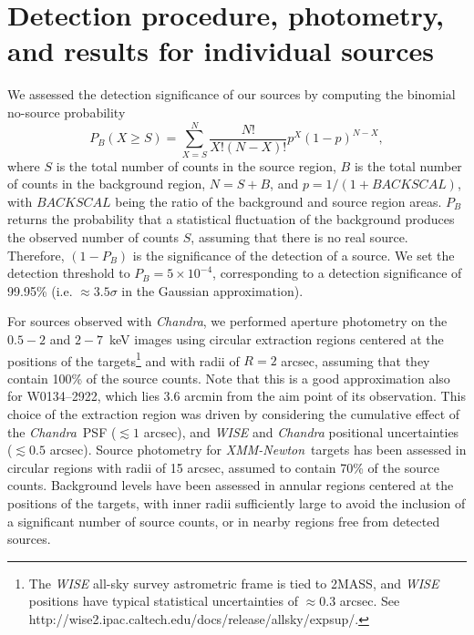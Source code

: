 \documentclass[useAMS,usenatbib]{mnras}
\newcommand*{\xmm}{\textit{\mbox{XMM-Newton}}}
\newcommand*{\chandra}{\textit{Chandra}}
\begin{document}
\section{Detection procedure, photometry, and results for individual sources}\label{detection}
We assessed the detection significance of our sources by computing the binomial no-source probability \citep{Weisskopf07,Broos07}
\begin{equation}\label{PB}
P_B(X\geq S)= \sum_{X=S}^{N}\frac{N!}{X!(N-X)!}p^X(1-p)^{N-X},
\end{equation}
where $S$ is the total number of counts in the source region, $B$ is the total number of counts in the background region, \mbox{$N=S+B$}, and $p=1/(1+BACKSCAL)$, with $BACKSCAL$ being the ratio of the background and source region areas. $P_B$ returns the probability that a statistical fluctuation of the background produces the observed number of counts $S$, assuming that there is no real source. Therefore, $(1-P_B)$ is the significance of the detection of a source.
We set the detection threshold to $P_B=5\times10^{-4}$, corresponding to a detection significance of 99.95\% (i.e. $\approx3.5\sigma$ in the Gaussian approximation).


For sources observed with \chandra, we performed aperture photometry on the $0.5-2$ and \mbox{$2-7$}~keV images using circular extraction regions centered at the positions of the targets\footnote{The \textit{WISE} all-sky survey astrometric frame is tied to 2MASS, and  \textit{WISE} positions have typical statistical uncertainties of $\approx0.3$ arcsec. See http://wise2.ipac.caltech.edu/docs/release/allsky/expsup/.} and with radii of $R=2$ arcsec, assuming that they contain 100\% of the source counts. Note that this is a good approximation also for W0134--2922, which lies 3.6 arcmin from the aim point of its observation. This choice of the extraction region was driven by considering the cumulative effect of the \chandra\, PSF ($\lesssim1$ arcsec), and \textit{WISE} and \textit{Chandra} positional uncertainties ($\lesssim0.5$ arcsec).
Source photometry for \xmm\, targets has been assessed in circular regions with radii of 15 arcsec, assumed to contain 70\% of the source counts.
Background levels have been assessed in annular regions centered at the positions of the targets, with inner radii sufficiently large to avoid the inclusion of a significant number of source counts, or in nearby regions free from detected sources.
\end{document}

